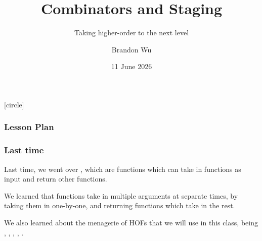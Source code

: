 \documentclass[aspectratio=169]{beamer}
\title{Combinators and Staging} %
\subtitle{Taking higher-order to the next level} %
\date{11 June 2026} %
\author{Brandon Wu} %
\newif\ifcolorlambda
\begin{document}
\ifweb
    \renewcommand{\pause}{}
\fi

[circle]

{
\begin{frame}[plain]
    \colorlambdatrue
    \titlepage
\end{frame}
}


\begin{frame}[fragile]
  \frametitle{Lesson Plan}

  \tableofcontents
\end{frame}


\begin{frame}[fragile]
  \frametitle{Last time}

  Last time, we went over , which are functions which
  can take in functions as input and return other functions.

  \pause
  \vspace{\fill}

  We learned that  functions take in multiple arguments at separate
  times, by taking them in one-by-one, and returning functions which take in the
  rest.

  \pause
  \vspace{\fill}

  We also learned about the menagerie of HOFs that we will use in this class,
  being , , , , .
\end{frame}

\end{document}
